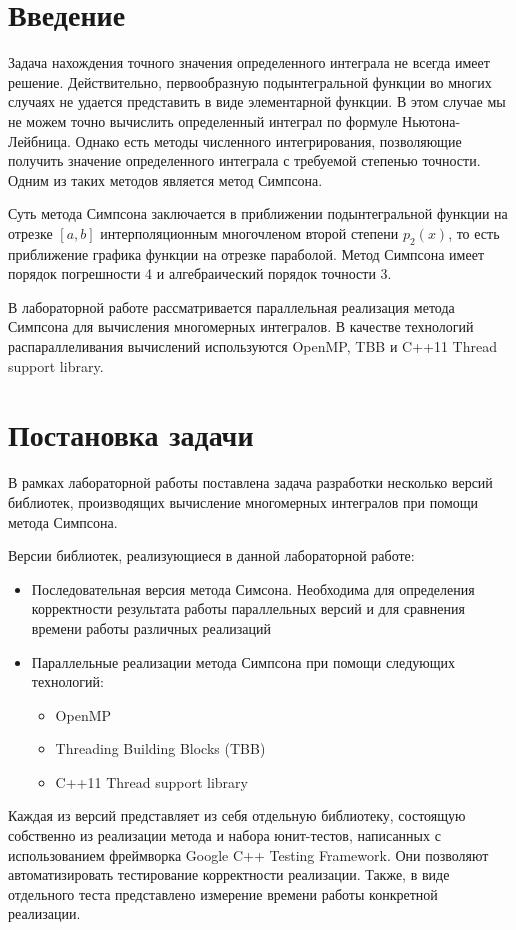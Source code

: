 \documentclass{report}
\begin{document}
\setcounter{page}{2}

\tableofcontents
\newpage

\section*{Введение}
Задача нахождения точного значения определенного интеграла не всегда имеет решение. Действительно, первообразную подынтегральной функции во многих случаях не удается представить в виде элементарной функции. В этом случае мы не можем точно вычислить определенный интеграл по формуле Ньютона-Лейбница. Однако есть методы численного интегрирования, позволяющие получить значение определенного интеграла с требуемой степенью точности. Одним из таких методов является метод Симпсона.
\par Суть метода Симпсона заключается в приближении подынтегральной функции на отрезке \([a,b]\) интерполяционным многочленом второй степени \(p_{2}(x)\), то есть приближение графика функции на отрезке параболой. Метод Симпсона имеет порядок погрешности 4 и алгебраический порядок точности 3.
\par В лабораторной работе рассматривается параллельная реализация метода Симпсона для вычисления многомерных интегралов. В качестве технологий распараллеливания вычислений используются OpenMP, TBB и C++11 Thread support library.
\newpage

\section*{Постановка задачи}
В рамках лабораторной работы поставлена задача разработки несколько версий библиотек, производящих вычисление многомерных интегралов при помощи метода Симпсона.
\par Версии библиотек, реализующиеся в данной лабораторной работе:
\begin{itemize}
\item Последовательная версия метода Симсона. Необходима для определения корректности результата работы параллельных версий и для сравнения времени работы различных реализаций
\item Параллельные реализации метода Симпсона при помощи следующих технологий:
    \begin{itemize}
    \item OpenMP
    \item Threading Building Blocks (TBB)
    \item C++11 Thread support library
    \end{itemize}
\end{itemize}
\par Каждая из версий представляет из себя отдельную библиотеку, состоящую собственно из реализации метода и набора юнит-тестов, написанных с использованием фреймворка Google C++ Testing Framework. Они позволяют автоматизировать тестирование корректности реализации. Также, в виде отдельного теста представлено измерение времени работы конкретной реализации.
\newpage
\end{document}
